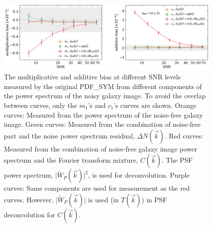 \documentclass[twocolumn]{aastex62}
\begin{document}
\begin{figure}[htbp]
	\centering
	\includegraphics[width=0.9\linewidth]{figures/pts_sample_components.pdf}
	\caption{The multiplicative and additive bias at different SNR levels measured by the original PDF\_SYM from different components of the power spectrum of the noisy galaxy image. To avoid the overlap between curves, only the $m_1$'s and $c_1$'s curves are shown. Orange curves: Measured from the power spectrum of the noise-free galaxy image. Green curves: Measured from the combination of noise-free part and the noise power spectrum residual, $\Delta N(\vec{k})$. Red curves: Measured from the combination of noise-free galaxy image power spectrum and the Fourier transform mixture, $C(\vec{k})$. The PSF power spectrum, $\vert \widetilde{W}_{P}(\vec{k})\vert^2$, is used for deconvolution. Purple curves: Same components are used for measurement as the red curves. However, $\vert \widetilde{W}_{P}(\vec{k})\vert$ is used (in $T(\vec{k})$) in PSF deconvolution for $C(\vec{k})$.}\label{fig:pts_componets}
\end{figure}
\end{document}
